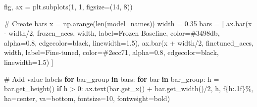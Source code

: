\documentclass[
  letterpaper,
  DIV=11,
  numbers=noendperiod]{scrartcl}
\newenvironment{Shaded}{\begin{snugshade}}{\end{snugshade}}
\newcommand{\BuiltInTok}[1]{\textcolor[rgb]{0.00,0.23,0.31}{#1}}
\newcommand{\CommentTok}[1]{\textcolor[rgb]{0.37,0.37,0.37}{#1}}
\newcommand{\ControlFlowTok}[1]{\textcolor[rgb]{0.00,0.23,0.31}{\textbf{#1}}}
\newcommand{\DecValTok}[1]{\textcolor[rgb]{0.68,0.00,0.00}{#1}}
\newcommand{\FloatTok}[1]{\textcolor[rgb]{0.68,0.00,0.00}{#1}}
\newcommand{\KeywordTok}[1]{\textcolor[rgb]{0.00,0.23,0.31}{\textbf{#1}}}
\newcommand{\NormalTok}[1]{\textcolor[rgb]{0.00,0.23,0.31}{#1}}
\newcommand{\OperatorTok}[1]{\textcolor[rgb]{0.37,0.37,0.37}{#1}}
\newcommand{\SpecialCharTok}[1]{\textcolor[rgb]{0.37,0.37,0.37}{#1}}
\newcommand{\SpecialStringTok}[1]{\textcolor[rgb]{0.13,0.47,0.30}{#1}}
\newcommand{\StringTok}[1]{\textcolor[rgb]{0.13,0.47,0.30}{#1}}
\renewenvironment{Shaded}{%
  \begin{tcolorbox}[%
    enhanced,%
    colback=codebg,%
    colframe=codebg,%
    borderline west={3pt}{0pt}{sectionblue},%
    boxrule=0pt,%
    arc=0pt,%
    boxsep=5pt,%
    left=2mm,%
    right=2mm,%
    top=2mm,%
    bottom=2mm%
  ]%
}{%
  \end{tcolorbox}%
}
\begin{document}
\begin{Shaded}
\begin{Highlighting}[]
\NormalTok{fig, ax }\OperatorTok{=}\NormalTok{ plt.subplots(}\DecValTok{1}\NormalTok{, }\DecValTok{1}\NormalTok{, figsize}\OperatorTok{=}\NormalTok{(}\DecValTok{14}\NormalTok{, }\DecValTok{8}\NormalTok{))}

\CommentTok{\# Create bars}
\NormalTok{x }\OperatorTok{=}\NormalTok{ np.arange(}\BuiltInTok{len}\NormalTok{(model\_names))}
\NormalTok{width }\OperatorTok{=} \FloatTok{0.35}
\NormalTok{bars }\OperatorTok{=}\NormalTok{ [}
\NormalTok{    ax.bar(x }\OperatorTok{{-}}\NormalTok{ width}\OperatorTok{/}\DecValTok{2}\NormalTok{, frozen\_accs, width, }
\NormalTok{           label}\OperatorTok{=}\StringTok{\textquotesingle{}Frozen Baseline\textquotesingle{}}\NormalTok{, color}\OperatorTok{=}\StringTok{\textquotesingle{}\#3498db\textquotesingle{}}\NormalTok{, }
\NormalTok{           alpha}\OperatorTok{=}\FloatTok{0.8}\NormalTok{, edgecolor}\OperatorTok{=}\StringTok{\textquotesingle{}black\textquotesingle{}}\NormalTok{, linewidth}\OperatorTok{=}\FloatTok{1.5}\NormalTok{),}
\NormalTok{    ax.bar(x }\OperatorTok{+}\NormalTok{ width}\OperatorTok{/}\DecValTok{2}\NormalTok{, finetuned\_accs, width, }
\NormalTok{           label}\OperatorTok{=}\StringTok{\textquotesingle{}Fine{-}tuned\textquotesingle{}}\NormalTok{, color}\OperatorTok{=}\StringTok{\textquotesingle{}\#2ecc71\textquotesingle{}}\NormalTok{, }
\NormalTok{           alpha}\OperatorTok{=}\FloatTok{0.8}\NormalTok{, edgecolor}\OperatorTok{=}\StringTok{\textquotesingle{}black\textquotesingle{}}\NormalTok{, linewidth}\OperatorTok{=}\FloatTok{1.5}\NormalTok{)}
\NormalTok{]}

\CommentTok{\# Add value labels}
\ControlFlowTok{for}\NormalTok{ bar\_group }\KeywordTok{in}\NormalTok{ bars:}
    \ControlFlowTok{for}\NormalTok{ bar }\KeywordTok{in}\NormalTok{ bar\_group:}
\NormalTok{        h }\OperatorTok{=}\NormalTok{ bar.get\_height()}
        \ControlFlowTok{if}\NormalTok{ h }\OperatorTok{\textgreater{}} \DecValTok{0}\NormalTok{:}
\NormalTok{            ax.text(bar.get\_x() }\OperatorTok{+}\NormalTok{ bar.get\_width()}\OperatorTok{/}\DecValTok{2}\NormalTok{, h, }
                   \SpecialStringTok{f\textquotesingle{}}\SpecialCharTok{\{}\NormalTok{h}\SpecialCharTok{:.1f\}}\SpecialStringTok{\%\textquotesingle{}}\NormalTok{, ha}\OperatorTok{=}\StringTok{\textquotesingle{}center\textquotesingle{}}\NormalTok{, va}\OperatorTok{=}\StringTok{\textquotesingle{}bottom\textquotesingle{}}\NormalTok{, }
\NormalTok{                   fontsize}\OperatorTok{=}\DecValTok{10}\NormalTok{, fontweight}\OperatorTok{=}\StringTok{\textquotesingle{}bold\textquotesingle{}}\NormalTok{)}


\end{Highlighting}
\end{Shaded}
\end{document}
